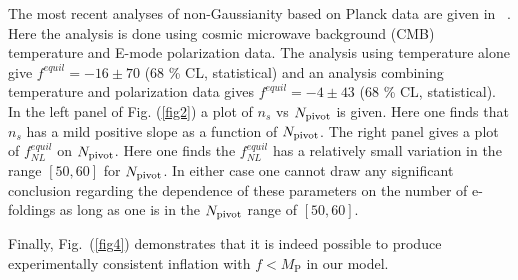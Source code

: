 \documentclass[a4paper,11pt]{article}
\begin{document}
  The most recent analyses of non-Gaussianity based on Planck data are given in ~\cite{Ade:2015ava}. 
  Here the analysis is done using cosmic microwave background (CMB) temperature and E-mode polarization 
  data. The  analysis using 
  temperature alone give $f^{equil} = -16 \pm 70$ (68 \% CL, statistical) and an analysis combining temperature and polarization data 
  gives $f^{equil} = -4 \pm 43$ (68 \% CL, statistical).
    In the left panel of Fig. (\ref{fig2})
  a plot of $n_s$ vs $N_{\rm pivot}$ is given. Here one finds that $n_s$ has a mild positive slope as a function of $N_{\rm pivot}$.
  The right panel gives a plot of $f^{equil}_{NL}$ on $N_{\rm pivot}$. Here one finds the $f^{equil}_{NL}$ has a relatively small variation in the range $[50,60]$ for
  $N_{\rm pivot}$. In either case one cannot draw any significant conclusion regarding the dependence of these parameters
  on the number of e-foldings as long as one is in the $N_{\rm pivot}$ range of $[50,60]$.

  Finally, Fig.~(\ref{fig4}) demonstrates that it is indeed possible to produce experimentally
  consistent inflation with $f < M_\text{P}$ in our model.

\end{document}
